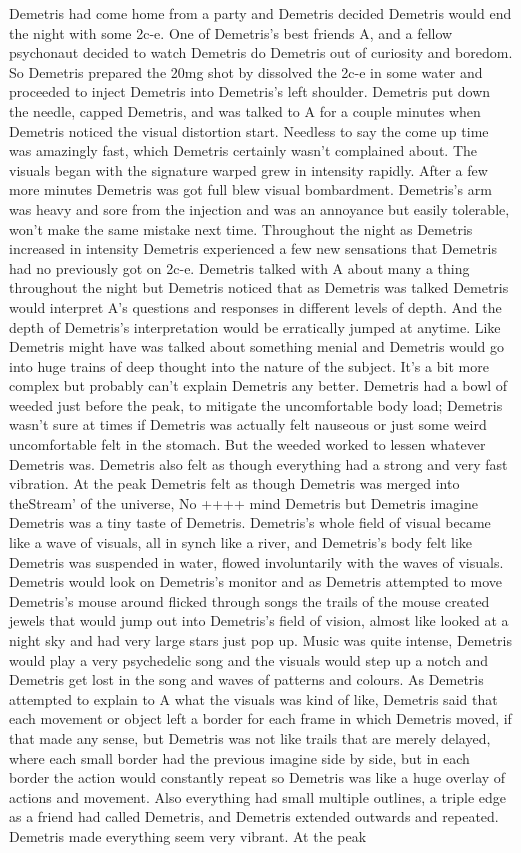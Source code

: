 \documentclass[12pt]{book}
\begin{document}
Demetris had come home from a party and Demetris decided Demetris would end the night with some 2c-e. One of Demetris's best friends A, and a fellow psychonaut decided to watch Demetris do Demetris out of curiosity and boredom. So Demetris prepared the 20mg shot by dissolved the 2c-e in some water and proceeded to inject Demetris into Demetris's left shoulder. Demetris put down the needle, capped Demetris, and was talked to A for a couple minutes when Demetris noticed the visual distortion start. Needless to say the come up time was amazingly fast, which Demetris certainly wasn't complained about. The visuals began with the signature warped grew in intensity rapidly. After a few more minutes Demetris was got full blew visual bombardment. Demetris's arm was heavy and sore from the injection and was an annoyance but easily tolerable, won't make the same mistake next time. Throughout the night as Demetris increased in intensity Demetris experienced a few new sensations that Demetris had no previously got on 2c-e. Demetris talked with A about many a thing throughout the night but Demetris noticed that as Demetris was talked Demetris would interpret A's questions and responses in different levels of depth. And the depth of Demetris's interpretation would be erratically jumped at anytime. Like Demetris might have was talked about something menial and Demetris would go into huge trains of deep thought into the nature of the subject. It's a bit more complex but probably can't explain Demetris any better. Demetris had a bowl of weeded just before the peak, to mitigate the uncomfortable body load; Demetris wasn't sure at times if Demetris was actually felt nauseous or just some weird uncomfortable felt in the stomach. But the weeded worked to lessen whatever Demetris was. Demetris also felt as though everything had a strong and very fast vibration. At the peak Demetris felt as though Demetris was merged into theStream' of the universe, No ++++ mind Demetris but Demetris imagine Demetris was a tiny taste of Demetris. Demetris's whole field of visual became like a wave of visuals, all in synch like a river, and Demetris's body felt like Demetris was suspended in water, flowed involuntarily with the waves of visuals. Demetris would look on Demetris's monitor and as Demetris attempted to move Demetris's mouse around flicked through songs the trails of the mouse created jewels that would jump out into Demetris's field of vision, almost like looked at a night sky and had very large stars just pop up. Music was quite intense, Demetris would play a very psychedelic song and the visuals would step up a notch and Demetris get lost in the song and waves of patterns and colours. As Demetris attempted to explain to A what the visuals was kind of like, Demetris said that each movement or object left a border for each frame in which Demetris moved, if that made any sense, but Demetris was not like trails that are merely delayed, where each small border had the previous imagine side by side, but in each border the action would constantly repeat so Demetris was like a huge overlay of actions and movement. Also everything had small multiple outlines, a triple edge as a friend had called Demetris, and Demetris extended outwards and repeated. Demetris made everything seem very vibrant. At the peak 
\end{document}
